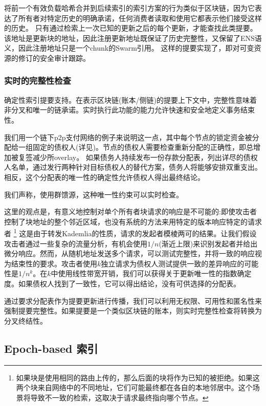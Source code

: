 将前一个有效负载哈希合并到后续索引的索引方案的行为类似于区块链，因为它表达了所有者对特定历史的明确承诺，任何消费者读取和使用它都表示他们接受这样的历史。
只有通过检索上一次已知的更新之后的每个更新，才能查找此类提要。该地址是更新块的地址，因此注册更新地址既保证了历史完整性，又保留了ENS语义，因此注册地址只是一个chunk的Swarm引用。
这样的提要实现了，即对可变资源的修订的安全审计跟踪。 

\subsubsection{实时的完整性检查}

确定性索引提要支持。在表示区块链(账本/侧链)的提要上下文中，完整性意味着非分叉和唯一的链承诺。实时执行此功能的能力允许快速和安全地定义事务结束性。

我们用一个链下p2p支付网络的例子来说明这一点，其中每个节点的锁定资金被分配给一组固定的债权人(详见\cite{ethersphere2019swap})。节点的债权人需要检查重新分配的正确性，即总增加被复签减少所overlay。
如果债务人持续发布一份存款分配表，列出详尽的债权人名单，通过发行两种针对目标债权人的替代方案，债务人将能够安排双重支出。相反，这个分配表的唯一性的确定性允许债权人得出最终结论。

我们声称，使用群馈源，这种唯一性约束可以实时检查。

这里的观点是，有意义地控制对单个所有者块请求的响应是不可能的:即使攻击者控制了块地址的整个邻近区域，也没有系统的方法来用特定的版本响应特定的请求者
%
\footnote{如果块是使用相同的路由上传的，那么后面的块将作为已知的被拒绝。如果这两个块来自网络中的不同地址，它们可能最终都在各自的本地邻居中。这个场景将导致不一致的检索，这取决于请求最终指向哪个节点。}
%
这是由于转发Kademlia的性质，请求的发起者模棱两可的结果。让我们假设攻击者通过一些复杂的流量分析，有机会使用$1/n$(渐近上限)来识别发起者并给出微分响应。然而，从随机地址发送多个请求，可以测试完整性，并将一致的响应视为结束性的要求。攻击者使用$k$独立请求为债权人测试提供一致的差异响应的可能性是$1/n^k$。在$k$中使用线性带宽开销，我们可以获得关于更新唯一性的指数确定度。如果债权人找到了一致性，它可以得出结论，没有可供选择的分配表。


通过要求分配表作为提要更新进行传播，我们可以利用无权限、可用性和匿名性来强制提要完整性。如果提要是一个类似区块链的账本，则实时完整性检查将转换为分叉终结性。 


\subsection{Epoch-based
索引\statusyellow}\label{sec:epoch-based-feeds}


